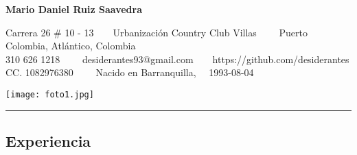 \documentclass[10pt,a4paper]{article}
\begin{document}
\begin{center}
{\LARGE \textbf{Mario Daniel Ruiz Saavedra}}

Carrera 26 \# 10 - 13\ \ 
\ \ Urbanización Country Club Villas\ \ \textbullet
\ \ Puerto Colombia, Atlántico, Colombia
\\
310 626 1218\ \ \textbullet
\ \ desiderantes93@gmail.com\ \ \textbullet \ \ https://github.com/desiderantes
\\
CC. 1082976380 \ \ \textbullet \ \ Nacido en Barranquilla, \ \ 1993-08-04


\vspace{0.4em}
\texttt{[image: foto1.jpg]}
\end{center}
\hrule
\vspace{-0.4em}
\subsection*{Experiencia}
\end{document}
